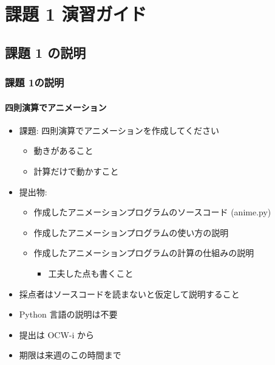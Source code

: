 %
%
\section{課題 1 演習ガイド}
\subsection{課題 1 の説明}
\begin{frame}
\frametitle{課題 1の説明}
\framesubtitle{四則演算でアニメーション}
  \begin{itemize}
\item 課題: 四則演算でアニメーションを作成してください
    \begin{itemize}
\item 動きがあること
\item 計算だけで動かすこと
    \end{itemize}
\item 提出物:
    \begin{itemize}
\item 作成したアニメーションプログラムのソースコード (anime.py)
\item 作成したアニメーションプログラムの使い方の説明
\item 作成したアニメーションプログラムの計算の仕組みの説明
      \begin{itemize}
\item 工夫した点も書くこと
      \end{itemize}
    \end{itemize}
\item 採点者はソースコードを読まないと仮定して説明すること
\item Python 言語の説明は不要
\item 提出は OCW-i から
\item 期限は来週のこの時間まで
  \end{itemize}
\end{frame}
